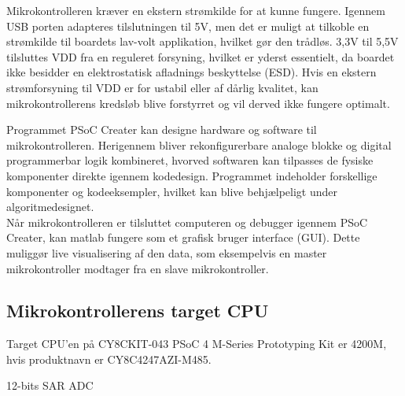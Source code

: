 Mikrokontrolleren kræver en ekstern strømkilde for at kunne fungere. Igennem USB porten adapteres tilslutningen til 5V, men det er muligt at tilkoble en strømkilde til boardets lav-volt applikation, hvilket gør den trådløs. 3,3V til 5,5V tilsluttes VDD fra en reguleret forsyning, hvilket er yderst essentielt, da boardet ikke besidder en elektrostatisk afladnings beskyttelse (ESD). Hvis en ekstern strømforsyning til VDD er for ustabil eller af dårlig kvalitet, kan mikrokontrollerens kredsløb blive forstyrret og vil derved ikke fungere optimalt. \citep{Semiconductor2016}

Programmet PSoC Creater kan designe hardware og software til mikrokontrolleren. Herigennem bliver rekonfigurerbare analoge blokke og digital programmerbar logik kombineret, hvorved softwaren kan tilpasses de fysiske komponenter direkte igennem kodedesign. Programmet indeholder forskellige komponenter og kodeeksempler, hvilket kan blive behjælpeligt under algoritmedesignet. \citep{Semiconductor2016} \\
Når mikrokontrolleren er tilsluttet computeren og debugger igennem PSoC Creater, kan matlab fungere som et grafisk bruger interface (GUI). Dette muliggør live visualisering af den data, som eksempelvis en master mikrokontroller modtager fra en slave mikrokontroller. 

\subsection{Mikrokontrollerens target CPU}
Target CPU'en på CY8CKIT-043 PSoC 4 M-Series Prototyping Kit er 4200M, hvis produktnavn er CY8C4247AZI-M485. 

12-bits SAR ADC



%
%
%
